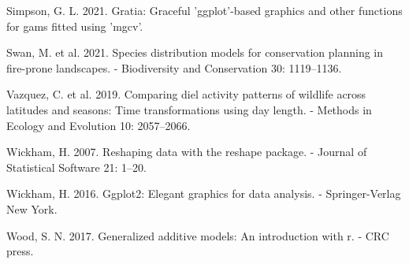 \documentclass[]{elsarticle} %
\begin{document}
\leavevmode\hypertarget{ref-gratia}{}%
Simpson, G. L. 2021. Gratia: Graceful 'ggplot'-based graphics and other functions for gams fitted using 'mgcv'.

\leavevmode\hypertarget{ref-swan2021species}{}%
Swan, M. et al. 2021. Species distribution models for conservation planning in fire-prone landscapes. - Biodiversity and Conservation 30: 1119--1136.

\leavevmode\hypertarget{ref-https:ux2fux2fdoi.orgux2f10.1111ux2f2041-210X.13290}{}%
Vazquez, C. et al. 2019. Comparing diel activity patterns of wildlife across latitudes and seasons: Time transformations using day length. - Methods in Ecology and Evolution 10: 2057--2066.

\leavevmode\hypertarget{ref-reshape}{}%
Wickham, H. 2007. Reshaping data with the reshape package. - Journal of Statistical Software 21: 1--20.

\leavevmode\hypertarget{ref-ggplot2}{}%
Wickham, H. 2016. Ggplot2: Elegant graphics for data analysis. - Springer-Verlag New York.

\leavevmode\hypertarget{ref-wood2017}{}%
Wood, S. N. 2017. Generalized additive models: An introduction with r. - CRC press.
\end{document}
